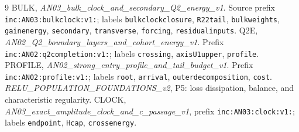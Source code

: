 \documentclass[11pt]{article}
\begin{document}
\begin{thebibliography}{9}
 BULK, \textit{AN03\_bulk\_clock\_and\_secondary\_Q2\_energy\_v1}.
Source prefix \texttt{inc:AN03:bulkclock:v1:}; labels
\texttt{bulkclockclosure}, \texttt{R22tail}, \texttt{bulkweights},
\texttt{gainenergy}, \texttt{secondary}, \texttt{transverse},
\texttt{forcing}, \texttt{residualinputs}.
 Q2E, \textit{AN02\_Q2\_boundary\_layers\_and\_cohort\_energy\_v1}.
Prefix \texttt{inc:AN02:q2completion:v1:}; labels
\texttt{crossing}, \texttt{axisU1upper}, \texttt{profile}.
 PROFILE, \textit{AN02\_strong\_entry\_profile\_and\_tail\_budget\_v1}.
Prefix \texttt{inc:AN02:profile:v1:}; labels \texttt{root},
\texttt{arrival}, \texttt{outerdecomposition}, \texttt{cost}.
 \textit{RELU\_POPULATION\_FOUNDATIONS\_v2}, P5:
loss dissipation, balance, and characteristic regularity.
 CLOCK,
\textit{AN03\_exact\_amplitude\_clock\_and\_c\_passage\_v1},
prefix \texttt{inc:AN03:clock:v1:}; labels
\texttt{endpoint}, \texttt{Hcap}, \texttt{crossenergy}.
\end{thebibliography}
\end{document}
